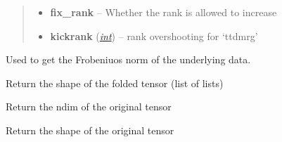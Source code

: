 \documentclass[a4paper,10pt,english]{sphinxmanual}
\begin{document}
\begin{fulllineitems}
\begin{fulllineitems}
\begin{quote}
\begin{description}
\begin{itemize}
\item {} 
\textbf{fix\_rank} -- Whether the rank is allowed to increase

\item {} 
\textbf{kickrank} (\href{http://docs.python.org/library/functions.html\#int}{\emph{int}}) -- rank overshooting for `ttdmrg'

\end{itemize}

\end{description}\end{quote}

\end{fulllineitems}


\begin{fulllineitems}
\label{api-qttvec:TensorToolbox.core.QTTvec.get_data_F_norm}
Used to get the Frobeniuos norm of the underlying data.

\end{fulllineitems}


\begin{fulllineitems}
\label{api-qttvec:TensorToolbox.core.QTTvec.get_folded_shape}
Return the shape of the folded tensor (list of lists)

\end{fulllineitems}


\begin{fulllineitems}
\label{api-qttvec:TensorToolbox.core.QTTvec.get_global_ndim}
Return the ndim of the original tensor

\end{fulllineitems}


\begin{fulllineitems}
\label{api-qttvec:TensorToolbox.core.QTTvec.get_global_shape}
Return the shape of the original tensor

\end{fulllineitems}


\end{fulllineitems}
\end{document}
